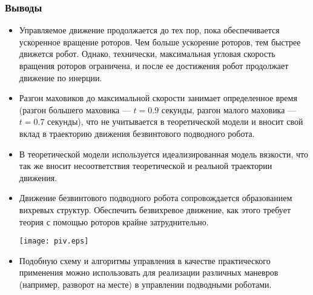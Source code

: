 \begin{frame}[allowframebreaks]
\frametitle{Выводы}

\begin{itemize}
	\item	Управляемое движение продолжается до тех пор, пока обеспечивается ускоренное вращение роторов. Чем больше ускорение роторов, тем быстрее движется робот. Однако, технически, максимальная угловая скорость вращения роторов ограничена, и после ее достижения робот продолжает движение по инерции.
	\item Разгон маховиков до максимальной скорости занимает определенное время (разгон большего маховика --- $t=0.9$ секунды, разгон малого маховика --- $t=0.7$ секунды), что не учитывается в теоретической модели и вносит свой вклад в траекторию движения безвинтового подводного робота.
	\item В теоретической модели используется идеализированная модель вязкости, что так же вносит несоответствия теоретической и реальной траектории движения.
	
		\framebreak
	
	\item	Движение безвинтового подводного робота сопровождается образованием вихревых структур. Обеспечить безвихревое движение, как этого требует теория с помощью роторов крайне затруднительно. 
	
	
		\begin{center}
			\texttt{[image: piv.eps]}
		\end{center}


	
	\item Подобную схему и алгоритмы управления в качестве практического применения можно использовать для реализации различных маневров (например, разворот на месте) в управлении подводными роботами.
\end{itemize}

\end{frame}



\section{}

\begin{frame}
\begin{center}
	\Huge
\end{center}
\end{frame}

